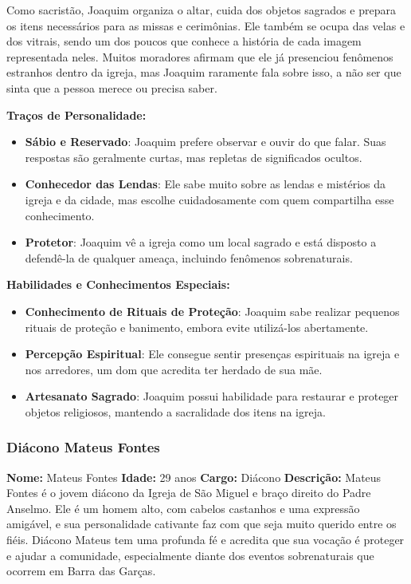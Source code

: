 Como sacristão, Joaquim organiza o altar, cuida dos objetos sagrados e prepara os itens necessários para as missas e cerimônias. Ele também se ocupa das velas e dos vitrais, sendo um dos poucos que conhece a história de cada imagem representada neles. Muitos moradores afirmam que ele já presenciou fenômenos estranhos dentro da igreja, mas Joaquim raramente fala sobre isso, a não ser que sinta que a pessoa merece ou precisa saber.

\textbf{Traços de Personalidade:}
\begin{itemize}
    \item \textbf{Sábio e Reservado}: Joaquim prefere observar e ouvir do que falar. Suas respostas são geralmente curtas, mas repletas de significados ocultos.
    \item \textbf{Conhecedor das Lendas}: Ele sabe muito sobre as lendas e mistérios da igreja e da cidade, mas escolhe cuidadosamente com quem compartilha esse conhecimento.
    \item \textbf{Protetor}: Joaquim vê a igreja como um local sagrado e está disposto a defendê-la de qualquer ameaça, incluindo fenômenos sobrenaturais.
\end{itemize}

\textbf{Habilidades e Conhecimentos Especiais:}
\begin{itemize}
    \item \textbf{Conhecimento de Rituais de Proteção}: Joaquim sabe realizar pequenos rituais de proteção e banimento, embora evite utilizá-los abertamente.
    \item \textbf{Percepção Espiritual}: Ele consegue sentir presenças espirituais na igreja e nos arredores, um dom que acredita ter herdado de sua mãe.
    \item \textbf{Artesanato Sagrado}: Joaquim possui habilidade para restaurar e proteger objetos religiosos, mantendo a sacralidade dos itens na igreja.
\end{itemize}



\subsubsection{Diácono Mateus Fontes}

\textbf{Nome:} Mateus Fontes  
\textbf{Idade:} 29 anos  
\textbf{Cargo:} Diácono  
\textbf{Descrição:}  
Mateus Fontes é o jovem diácono da Igreja de São Miguel e braço direito do Padre Anselmo. Ele é um homem alto, com cabelos castanhos e uma expressão amigável, e sua personalidade cativante faz com que seja muito querido entre os fiéis. Diácono Mateus tem uma profunda fé e acredita que sua vocação é proteger e ajudar a comunidade, especialmente diante dos eventos sobrenaturais que ocorrem em Barra das Garças.

